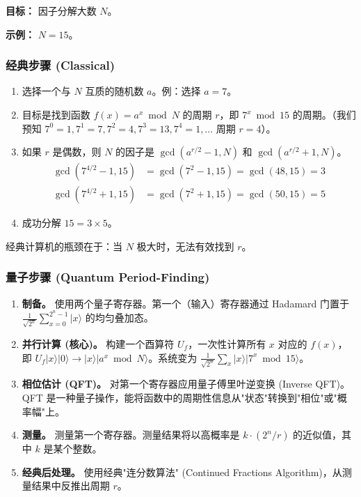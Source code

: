 \documentclass[11pt,a4paper]{article}
\begin{document}
\textbf{目标：} 因子分解大数 $N$。

\textbf{示例：} $N=15$。

\subsubsection{经典步骤 (Classical)}

\begin{enumerate}
\item 选择一个与 $N$ 互质的随机数 $a$。例：选择 $a=7$。
\item 目标是找到函数 $f(x) = a^x \bmod N$ 的周期 $r$，即 $7^x \bmod 15$ 的周期。（我们预知 $7^0=1, 7^1=7, 7^2=4, 7^3=13, 7^4=1,\ldots$ 周期 $r=4$）。
\item 如果 $r$ 是偶数，则 $N$ 的因子是 $\gcd(a^{r/2}-1, N)$ 和 $\gcd(a^{r/2}+1, N)$。
\begin{align*}
\gcd(7^{4/2}-1, 15) &= \gcd(7^2-1, 15) = \gcd(48, 15) = 3 \\
\gcd(7^{4/2}+1, 15) &= \gcd(7^2+1, 15) = \gcd(50, 15) = 5
\end{align*}
\item 成功分解 $15 = 3 \times 5$。
\end{enumerate}

经典计算机的瓶颈在于：当 $N$ 极大时，无法有效找到 $r$。

\subsubsection{量子步骤 (Quantum Period-Finding)}

\begin{enumerate}
\item \textbf{制备。} 使用两个量子寄存器。第一个（输入）寄存器通过 Hadamard 门置于 $\frac{1}{\sqrt{2^n}}\sum_{x=0}^{2^n-1}|x\rangle$ 的均匀叠加态。
\item \textbf{并行计算 (核心)。} 构建一个酉算符 $U_f$，一次性计算所有 $x$ 对应的 $f(x)$，即 $U_f |x\rangle |0\rangle \rightarrow |x\rangle |a^x \bmod N\rangle$。系统变为 $\frac{1}{\sqrt{2^n}}\sum_{x} |x\rangle |7^x \bmod 15\rangle$。
\item \textbf{相位估计 (QFT)。} 对第一个寄存器应用量子傅里叶逆变换 (Inverse QFT)。QFT 是一种量子操作，能将函数中的周期性信息从"状态"转换到"相位"或"概率幅"上。
\item \textbf{测量。} 测量第一个寄存器。测量结果将以高概率是 $k \cdot (2^n / r)$ 的近似值，其中 $k$ 是某个整数。
\item \textbf{经典后处理。} 使用经典"连分数算法" (Continued Fractions Algorithm)，从测量结果中反推出周期 $r$。
\end{enumerate}
\end{document}
